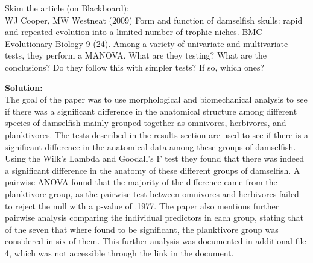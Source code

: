 \documentclass[12pt]{article}
\makeatletter
\theoremstyle{homework}
\newenvironment{exercise}[1]
{\def\@currentlabel{#1}\exercisecore}
{\endexercisecore}
\newcommand{\localhead}[1]{\par\smallskip\noindent\textbf{#1}\nobreak\\}%
\newcommand\solution{\localhead{Solution:}}
\makeatother
\begin{document}
\begin{exercise}{2} 
  Skim the article (on Blackboard):\\
  WJ Cooper, MW Westneat (2009)  Form and function of damselfish skulls:  rapid and repeated evolution into a limited number of trophic niches.  BMC Evolutionary Biology 9 (24).
  Among a variety of univariate and multivariate tests, they perform a MANOVA.  What are they testing?  What are the conclusions?  Do they follow this with simpler tests?  If so, which ones?\\
  \solution The goal of the paper was to use morphological and biomechanical analysis to see if there was a significant difference in the anatomical structure among different species of damselfish
  mainly grouped together as omnivores, herbivores, and planktivores. The tests described in the results section are used to see if there is a significant difference in the anatomical data among these groups of 
  damselfish. Using the Wilk's Lambda and Goodall's F test they found that there was indeed a significant difference in the anatomy of these different groups of damselfish. A pairwise ANOVA found that the majority 
  of the difference came from the planktivore group, as the pairwise test between omnivores and herbivores failed to reject the null with a p-value of .1977. 
  The paper also mentions further pairwise analysis comparing the individual predictors in each group, stating that of the seven that where found to be significant, the planktivore group was considered in six of them. 
  This further analysis was documented in additional file 4, which was not accessible through the link in the document.  

\end{exercise}
\vspace{1in}
\end{document}
